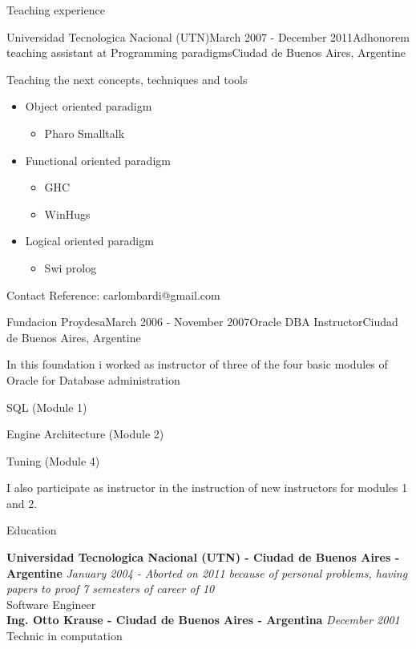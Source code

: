 \documentclass{resume} %
\begin{document}
\begin{rSection}{Teaching experience}
\begin{rSubsection}{Universidad Tecnologica Nacional (UTN)}{March 2007 - December 2011}{Adhonorem teaching assistant at Programming paradigms}{Ciudad de Buenos Aires, Argentine}
\item Teaching the next concepts, techniques and tools
\begin{itemize}
	\item Object oriented paradigm
	\begin{itemize}
		\item Pharo Smalltalk
	\end{itemize}
	\item Functional oriented paradigm
	\begin{itemize}
		\item GHC
		\item WinHugs
	\end{itemize}
	\item Logical oriented paradigm 
	\begin{itemize}
		\item  Swi prolog
	\end{itemize}
\end{itemize}
\item Contact Reference: carlombardi@gmail.com
\end{rSubsection}


\begin{rSubsection}{Fundacion Proydesa}{March 2006 - November 2007}{Oracle DBA Instructor}{Ciudad de Buenos Aires, Argentine}
	\item In this foundation i worked as instructor of three of the four basic modules of Oracle for Database administration
	\item SQL (Module 1)
	\item Engine Architecture (Module 2)
	\item Tuning (Module 4)
	\item I also participate as instructor in the instruction of new instructors for modules 1 and 2.
\end{rSubsection}


\end{rSection}




\begin{rSection}{Education}


{\bf Universidad Tecnologica Nacional (UTN) - Ciudad de Buenos Aires - Argentine} \hfill {\em January 2004 - Aborted on 2011 because of personal problems, having papers to proof 7 semesters of career of 10 } \\ 
Software Engineer  \\

{\bf Ing. Otto Krause - Ciudad de Buenos Aires - Argentina} \hfill {\em December 2001} \\ 
Technic in computation \\
\end{rSection}
\end{document}

